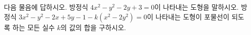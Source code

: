 다음 물음에 답하시오.
 방정식 $4x^2-y^2-2y+3=0$이 나타내는 도형을 \mbox{말하시오.}
 방정식 $3x^2-y^2-2x+5y-1-k(x^2-2y^2)=0$이 나타내는 도형이 포물선이 되도록 하는 모든 실수 $k$의 값의 합을 구하시오.
